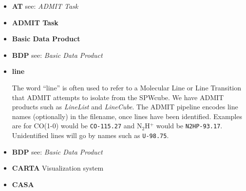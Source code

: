 \documentclass[preprint]{aastex}
\begin{document}
\begin{itemize}

\item {\bf AT}
see: {\it ADMIT Task}

\item {\bf ADMIT Task}

\item {\bf Basic Data Product}

\item {\bf BDP}
see: {\it Basic Data Product}

\item {\bf line}

The word ``line'' is often used to refer to a Molecular Line or Line Transition
that ADMIT attempts to isolate from the SPWcube.
We have ADMIT products such as {\it LineList} and {\it LineCube}.
The ADMIT pipeline encodes line names (optionally) in the filename, once lines have 
been identified.  Examples are for CO(1-0) would be {\tt CO-115.27} and 
N$_2$H$^+$ would be {\tt N2HP-93.17}. Unidentified lines will go by
names such as {\tt U-98.75}.


\item {\bf BDP}
see: {\it Basic Data Product}

\item {\bf CARTA}
Visualization system

\item {\bf CASA}

\end{itemize}
\end{document}
